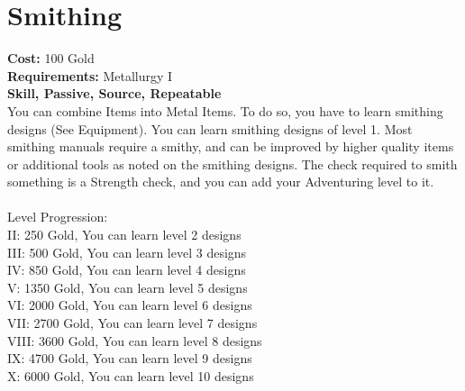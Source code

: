 \section*{Smithing}
\textbf{Cost:} 100 Gold\\
\textbf{Requirements:} Metallurgy I\\
\textbf{Skill, Passive, Source, Repeatable}\\
You can combine Items into Metal Items. To do so, you have to learn smithing designs (See Equipment). You can learn smithing designs of level 1. Most smithing manuals require a smithy, and can be improved by higher quality items or additional tools as noted on the smithing designs. The check required to smith something is a Strength check, and you can add your Adventuring level to it.\\
\\
Level Progression:\\
II: 250 Gold, You can learn level 2 designs\\
III: 500 Gold, You can learn level 3 designs\\
IV: 850 Gold, You can learn level 4 designs\\
V: 1350 Gold, You can learn level 5 designs\\
VI: 2000 Gold, You can learn level 6 designs\\
VII: 2700 Gold, You can learn level 7 designs\\
VIII: 3600 Gold, You can learn level 8 designs\\
IX: 4700 Gold, You can learn level 9 designs\\
X: 6000 Gold, You can learn level 10 designs\\